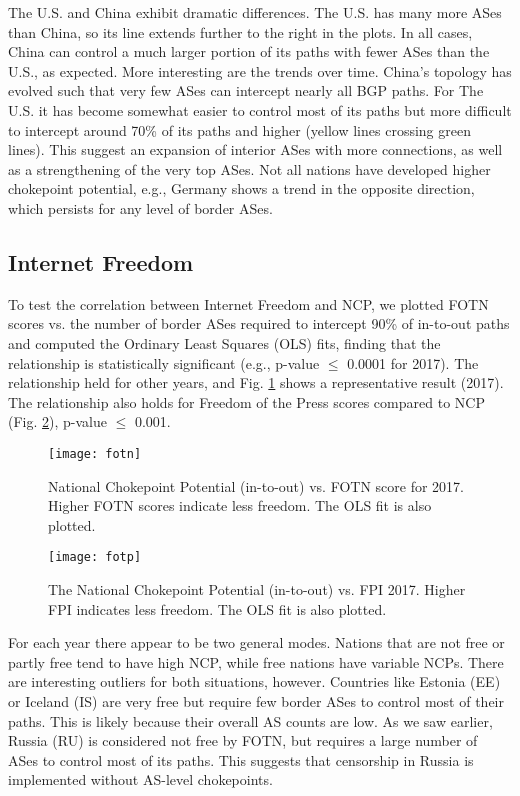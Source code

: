 The U.S. and China exhibit dramatic differences. The U.S. has many
more ASes than China, so its line extends further to the right in the
plots. In all cases, China can control a much larger portion of its
paths with fewer ASes than the U.S., as expected. More interesting are
the trends over time.  China's topology has evolved such that very few
ASes can intercept nearly all BGP paths. For The U.S. it has become
somewhat easier to control most of its paths but more difficult to
intercept around 70\% of its paths and higher (yellow lines crossing
green lines).  This suggest an expansion of interior ASes with more
connections, as well as a strengthening of the very top ASes.
Not all nations have developed higher chokepoint potential, e.g., Germany shows a trend
in the opposite direction, which persists for any level of border ASes.

\subsection{Internet Freedom}

To test the correlation between Internet Freedom and NCP, we plotted
FOTN scores vs. the number of border ASes required to intercept 90\% of in-to-out
paths and computed the Ordinary
Least Squares (OLS) fits, finding that the relationship is
statistically significant (e.g., p-value $\leq$ 0.0001 for 2017). The
relationship held for other years, and 
Fig. \ref{fig:fotn} shows a representative result (2017).  The relationship also holds for Freedom of the Press scores compared to NCP (Fig. \ref{fig:fotp}), p-value $\leq$ 0.001.

\begin{figure}
	\centering
	\texttt{[image: fotn]}
	\caption{National Chokepoint Potential (in-to-out) vs. FOTN score
	for 2017. Higher FOTN scores indicate less freedom. The OLS fit is also plotted.}\label{fig:fotn}
\end{figure}

\begin{figure}
	\centering
	\texttt{[image: fotp]}
	\caption{The National Chokepoint Potential (in-to-out) vs. FPI
	2017. Higher FPI indicates less freedom. The OLS fit is also plotted.}\label{fig:fotp}
\end{figure}

For each year there appear to be two general modes.  Nations that are
not free or partly free tend to have high NCP, while free nations have
variable NCPs. There are interesting outliers for both situations,
however. Countries like Estonia (EE) or Iceland (IS) are very free but
require few border ASes to control most of their paths. This is likely
because their overall AS counts are low. As we saw earlier, Russia
(RU) is considered not free by FOTN, but requires a large number of
ASes to control most of its paths. This suggests that censorship
in Russia is implemented without AS-level
chokepoints.
